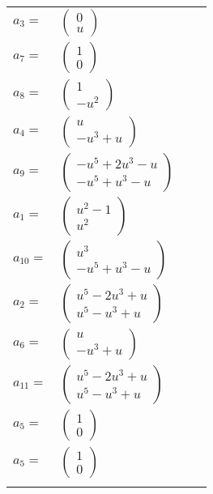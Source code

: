 \documentclass[1p]{elsarticle_modified}
\theoremstyle{definition}
\begin{document}
\begin{tabular}{m{7pt} m{180pt} m{7pt} m{180pt} }
\flushright $a_{3}=$&$\begin{pmatrix}0\\u\end{pmatrix}$ \\
\flushright $a_{7}=$&$\begin{pmatrix}1\\0\end{pmatrix}$ \\
\flushright $a_{8}=$&$\begin{pmatrix}1\\- u^2\end{pmatrix}$ \\
\flushright $a_{4}=$&$\begin{pmatrix}u\\- u^3+u\end{pmatrix}$ \\
\flushright $a_{9}=$&$\begin{pmatrix}- u^5+2 u^3- u\\- u^5+u^3- u\end{pmatrix}$ \\
\flushright $a_{1}=$&$\begin{pmatrix}u^2-1\\u^2\end{pmatrix}$ \\
\flushright $a_{10}=$&$\begin{pmatrix}u^3\\- u^5+u^3- u\end{pmatrix}$ \\
\flushright $a_{2}=$&$\begin{pmatrix}u^5-2 u^3+u\\u^5- u^3+u\end{pmatrix}$ \\
\flushright $a_{6}=$&$\begin{pmatrix}u\\- u^3+u\end{pmatrix}$ \\
\flushright $a_{11}=$&$\begin{pmatrix}u^5-2 u^3+u\\u^5- u^3+u\end{pmatrix}$ \\
\flushright $a_{5}=$&$\begin{pmatrix}1\\0\end{pmatrix}$\\ \flushright $a_{5}=$&$\begin{pmatrix}1\\0\end{pmatrix}$\\&\end{tabular}
\end{document}
